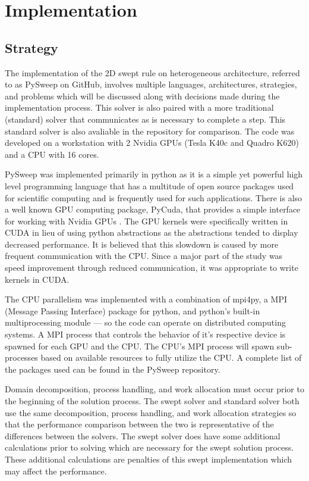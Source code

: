 \documentclass[review]{elsarticle}
\begin{document}
%
%

\section{Implementation}
\subsection{Strategy}
The implementation of the 2D swept rule on heterogeneous architecture, referred to as PySweep on GitHub, involves multiple languages, architectures, strategies, and problems which will be discussed along with decisions made during the implementation process. This solver is also paired with a more traditional (standard) solver that communicates as is necessary to complete a step. This standard solver is also avaliable in the repository for comparison. The code was developed on a workstation with 2 Nvidia GPUs (Tesla K40c and Quadro K620) and a CPU with 16 cores.

\par
PySweep was implemented primarily in python as it is a simple yet powerful high level programming language that has a multitude of open source packages used for scientific computing and is frequently used for such applications. There is also a well known GPU computing package, PyCuda, that provides a simple interface for working with Nvidia GPUs \cite{KlocknerPyCUDAGeneration}. The GPU kernels were specifically written in CUDA in lieu of using python abstractions as the abstractions tended to display decreased performance. It is believed that this slowdown is caused by more frequent communication with the CPU. Since a major part of the study was speed improvement through reduced communication, it was appropriate to write kernels in CUDA. 

\par
The CPU parallelism was implemented with a combination of mpi4py, a MPI (Message Passing Interface) package for python, and python's built-in multiprocessing module --- so the code can operate on distributed computing systems. A MPI process that controls the behavior of it's respective device is spawned for each GPU and the CPU. The CPU's MPI process will spawn sub-processes based on available resources to fully utilize the CPU. A complete list of the packages used can be found in the PySweep repository.

\par Domain decomposition, process handling, and work allocation must occur prior to the beginning of the solution process. The swept solver and standard solver both use the same decomposition, process handling, and work allocation strategies so that the performance comparison between the two is representative of the differences between the solvers. The swept solver does have some additional calculations prior to solving which are necessary for the swept solution process. These additional calculations are penalties of this swept implementation which may affect the performance. 
\end{document}
